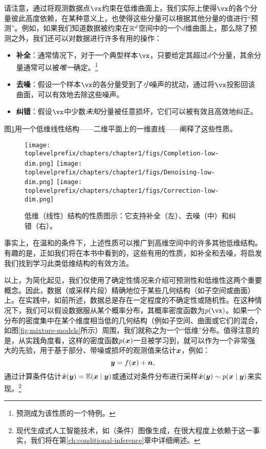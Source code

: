 \documentclass[../../book-main_zh.tex]{subfiles}
\begin{document}
请注意，通过将观测数据点$\vx$约束在低维曲面上，我们实际上使得$\vx$的各个分量彼此高度依赖，在某种意义上，也使得这些分量可以根据其他分量的值进行“预测”。例如，如果我们知道数据被约束在$\mathbb{R}^d$空间中的一个$d$维曲面上，那么除了预测之外，我们还可以对数据进行许多有用的操作：%
\begin{itemize}
    \item \textbf{补全}：通常情况下，对于一个典型样本$\vx$，只要给定其超过$d$个分量，其余分量通常可以被{\em 唯一}确定。\footnote{预测成为该性质的一个特例。}
    \item \textbf{去噪}：假设一个样本$\vx$的各分量受到了{\em 小}噪声的扰动，通过将$\vx$投影回该曲面，可以有效地去除这些噪声。
    \item \textbf{纠错}：假设$\vx$中少数{\em 未知}分量被任意损坏，它们可以被有效且高效地纠正。
\end{itemize}
图\ref{fig:low-dim-properties}用一个低维线性结构——二维平面上的一维直线——阐释了这些性质。

\begin{figure}
    \centering
    \texttt{[image: \\toplevelprefix/chapters/chapter1/figs/Completion-low-dim.png]}     \texttt{[image: \\toplevelprefix/chapters/chapter1/figs/Denoising-low-dim.png]} \texttt{[image: \\toplevelprefix/chapters/chapter1/figs/Correction-low-dim.png]} 
    \caption{低维（线性）结构的性质图示：它支持补全（左）、去噪（中）和纠错（右）。}
    \label{fig:low-dim-properties}
\end{figure}

事实上，在温和的条件下，上述性质可以推广到高维空间中的许多其他低维结构\cite{Wright-Ma-2022}。有趣的是，正如我们将在本书中看到的，这些有用的性质，如补全和去噪，将启发我们找到学习此类低维结构的有效方法。

以上，为简化起见，我们仅使用了确定性情况来介绍可预测性和低维性这两个重要概念。因此，数据（或采样片段）精确地位于某些几何结构（如子空间或曲面）上。在实践中，如前所述，数据总是存在一定程度的不确定性或随机性。在这种情况下，我们可以假设数据服从某个概率分布，其概率密度函数为$p(\vx)$。如果一个分布的密度集中在某个维度相当低的几何结构（例如子空间、曲面或它们的混合，如图\ref{fig:mixture-models}所示）周围，我们就称之为一个“低维”分布。值得注意的是，从实践角度看，这样的密度函数$p(\bm{x})$一旦被学习到，就可以作为一个非常强大的先验，用于基于部分、带噪或损坏的观测值来估计$\bm{x}$，例如：
\begin{equation}
\bm{y} = f(\bm{x}) + \boldsymbol{n},
\end{equation}
通过计算条件估计$\hat{\bm{x}}(\bm{y}) = \mathbb{E}(\bm{x} \mid \bm{y})$或通过对条件分布进行采样$\hat{\bm{x}}(\bm{y}) \sim p(\bm{x}\mid \bm{y})$来实现。\footnote{现代生成式人工智能技术，如（条件）图像生成，在很大程度上依赖于这一事实，我们将在第\ref{ch:conditional-inference}章中详细阐述。}
\end{document}
